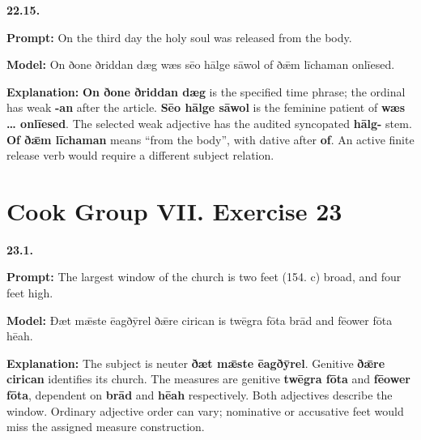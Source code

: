\par\begin{minipage}{\linewidth}\raggedright
\textbf{22.15.}

\textbf{Prompt:} On the third day the holy soul was released from the body.

\textbf{Model:} On ðone ðriddan dæg wæs sēo hālge sāwol of ðǣm līchaman onlīesed.

\textbf{Explanation:} \textbf{On ðone ðriddan dæg} is the specified time phrase; the ordinal has weak \textbf{-an} after the article. \textbf{Sēo hālge sāwol} is the feminine patient of \textbf{wæs … onlīesed}. The selected weak adjective has the audited syncopated \textbf{hālg-} stem. \textbf{Of ðǣm līchaman} means “from the body”, with dative after \textbf{of}. An active finite release verb would require a different subject relation.

\end{minipage}\par\addvspace{4pt}

\section*{Cook Group VII. Exercise 23}

\par\begin{minipage}{\linewidth}\raggedright
\textbf{23.1.}

\textbf{Prompt:} The largest window of the church is two feet (154. c) broad, and four feet high.

\textbf{Model:} Ðæt mǣste ēagðȳrel ðǣre cirican is twēgra fōta brād and fēower fōta hēah.

\textbf{Explanation:} The subject is neuter \textbf{ðæt mǣste ēagðȳrel}. Genitive \textbf{ðǣre cirican} identifies its church. The measures are genitive \textbf{twēgra fōta} and \textbf{fēower fōta}, dependent on \textbf{brād} and \textbf{hēah} respectively. Both adjectives describe the window. Ordinary adjective order can vary; nominative or accusative feet would miss the assigned measure construction.

\end{minipage}\par\addvspace{4pt}

